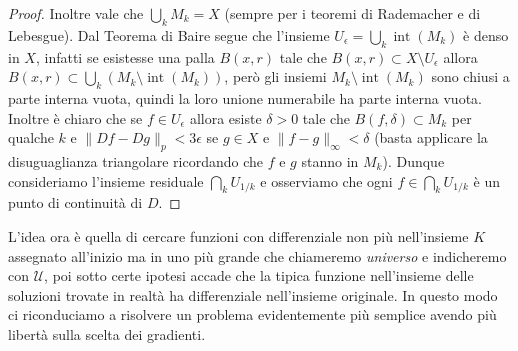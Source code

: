 \documentclass[a4paper,11pt]{book}
\theoremstyle{plain}
\theoremstyle{definition}
\theoremstyle{remark}
\newcommand{\norm}[1]{\lVert#1\rVert}
\DeclareMathOperator{\Int}{int}
\begin{document}
\begin{proof}
\begin{comment}
		\leq \norm{\Delta_{l}(f)-\Delta_{l}(f_{h})}_{p}+\norm{\Delta_{l}(f_{h})-\Delta_{r}(f_{h})}_{p}+\norm{\Delta_{r}(f_{h})-\Delta_{r}(f)}_{p}+\norm{\Delta_{r}(f)-Df}_{p}.
    \end{gather*}
    Ora si osserva che il primo e il terzo addendo della stima data sopra possono essere presi piccoli a piacere prendendo $h$ sufficientemente grande, e anche il quarto può essere preso piccolo a piacere prendendo $r$ abbastanza grande (in virtù di quanto detto prima riguardo alla relazione tra $D$ e le mappe $\Delta_{r}$. Resta solo da studiare il secondo addendo, che può essere stimato con
    \[
		\norm{\Delta_{l}(f_{h})-\Delta_{r}(f_{h})}_{p}\leq \norm{\Delta_{l}(f_{h})-Df_{h}}_{p}+\norm{Df_{h}-\Delta_{r}(f_{h})}_{p}\leq \epsilon+\norm{Df_{h}-\Delta_{r}(f_{h})}_{p},
    \]
    dove abbiamo stimato il primo addendo con $\epsilon$ poiché $f_{h}\in M_{k}$ mentre il secondo può essere preso piccolo quanto vogliamo allo stesso modo di prima (prendendo $r$ abbastanza grande), dunque $M_{k}$ è chiuso.\\
    \end{comment}
    
    Inoltre vale che $\bigcup_k M_k=X$ (sempre per i teoremi di Rademacher e di Lebesgue). Dal Teorema di Baire segue che l'insieme $U_{\epsilon}=\bigcup_k\Int(M_k)$ è denso in $X$, infatti se esistesse una palla $B(x,r)$ tale che $B(x,r)\subset X\setminus U_{\epsilon}$ allora $B(x,r)\subset \bigcup_{k}(M_{k}\setminus \Int(M_{k}))$, però gli insiemi $M_{k}\setminus \Int(M_{k})$ sono chiusi a parte interna vuota, quindi la loro unione numerabile ha parte interna vuota. Inoltre è chiaro che se $f\in U_{\epsilon}$ allora esiste $\delta>0$ tale che $B(f,\delta)\subset M_k$ per qualche $k$ e $\norm{Df-Dg}_p<3\epsilon$ se $g\in X$ e $\norm{f-g}_{\infty}<\delta$ (basta applicare la disuguaglianza triangolare ricordando che $f$ e $g$ stanno in $M_k$). Dunque consideriamo l'insieme residuale $\bigcap_k U_{1/k}$ e osserviamo che ogni $f\in \bigcap_kU_{1/k}$ è un punto di continuità di $D$.
\end{proof}
L'idea ora è quella di cercare funzioni con differenziale non più nell'insieme $K$ assegnato all'inizio ma in uno più grande che chiameremo \textit{universo} e indicheremo con $\mathcal{U}$, poi sotto certe ipotesi accade che la tipica funzione nell'insieme delle soluzioni trovate in realtà ha differenziale nell'insieme originale. In questo modo ci riconduciamo a risolvere un problema evidentemente più semplice avendo più libertà sulla scelta dei gradienti.
\end{document}
